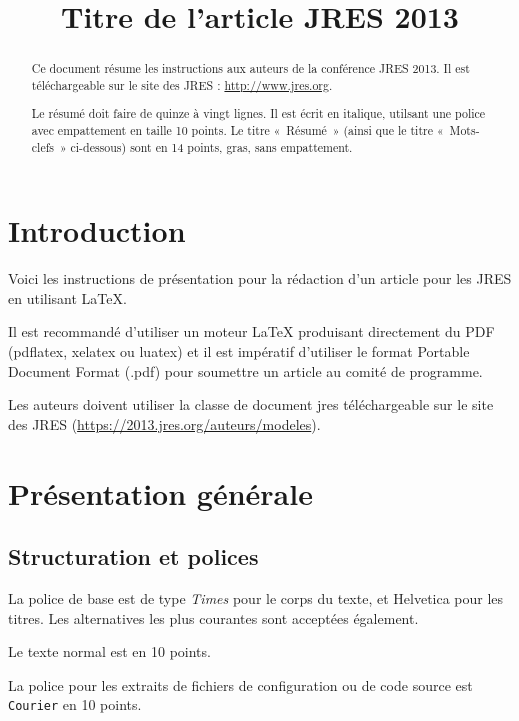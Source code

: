 \documentclass[city=Montpellier,year=2013]{jres}
\title{Titre de l'article JRES 2013}
\begin{document}
\maketitle

\begin{abstract}
Ce document résume les instructions aux auteurs de la conférence JRES 2013.
Il est téléchargeable sur le site des JRES : \url{http://www.jres.org}.

Le résumé doit faire de quinze à vingt lignes. Il est écrit en italique,
utilsant une police avec empattement en taille 10 points.
Le titre « Résumé » (ainsi que le titre « Mots-clefs » ci-dessous)
sont en 14 points, gras, sans empattement.
\end{abstract}


\section{Introduction}

Voici les instructions de présentation pour la rédaction d'un article
pour les JRES en utilisant \LaTeX{}.

Il est recommandé d'utiliser un moteur \LaTeX{} produisant directement
du PDF (pdflatex, xelatex ou luatex) et il est
impératif d'utiliser le format Portable Document Format (.pdf) pour
soumettre un article au comité de programme.

Les auteurs doivent utiliser la classe de document jres téléchargeable
sur le site des JRES (\url{https://2013.jres.org/auteurs/modeles}).

\section{Présentation générale}

\subsection{Structuration et polices}

La police de base est de type \emph{Times} pour le corps du texte, et
\textsf{Helvetica} pour les titres. Les alternatives les plus
courantes sont acceptées également.

Le texte  normal est en 10 points.

La police pour les extraits de fichiers de configuration ou de code
source est \texttt{Courier} en 10 points.
\end{document}
